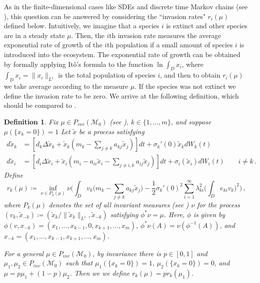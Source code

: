 \documentclass[final]{amsart}
\newtheorem{deff}[thm]{Definition}
\numberwithin{thm}{section}
\numberwithin{equation}{section}
\newcommand{\mcM}{\mathcal{M}}
\begin{document}
As in the finite-dimensional cases like SDEs and discrete time Markov chains (see \cite{ecologicalContinuous, ecologicalDiscrete, ecologicalGeneral}), this question can be answered by considering the ``invasion rates" $r_i(\mu)$ defined below. Intuitively, we imagine that a species $i$ is extinct and other species are in a steady state $\mu$. Then, 
the $i$th invasion rate measures the average exponential rate of growth of the $i$th population if a small amount of species $i$ is introduced into the ecosystem.
The exponential rate of growth can be obtained by formally applying It\^{o}'s formula to the function $\ln{\int_D x_i}$, where $\int_D x_i = \|x_i\|_{L^1}$ is the total population of species $i$, and then to obtain $r_i(\mu)$ we take average according to the measure $\mu$. If the species was not extinct we define the invasion rate to be zero. We arrive at the following definition, which should be compared to \cite[(2.3) and Proposition 3.1]{ecologicalGeneral}.

\begin{deff}\label{def:invasion-rates}
    Fix $\mu \in P_{inv}(\mcM_0)$ (see ), $k \in \{1,\dots,m\}$, and suppose $\mu(\{x_k = 0\}) = 1$ 
    Let $\tilde{x}$ be a process satisfying
    \begin{align*}
        d\tilde x_k &= [d_k\Delta \tilde x_k + \tilde x_k(m_k -\sum_{j\neq k}a_{kj}\tilde x_j)]dt + \sigma_k'(0)\tilde x_kdW_k(t) \\
        d\tilde x_i &= [d_i\Delta \tilde x_i + \tilde x_i(m_i - a_{ii}\tilde x_i -\sum_{j \neq i,k}a_{ij} \tilde x_j)]dt + \sigma_i(\tilde x_i)dW_i(t) \qquad i \neq k \,. 
    \end{align*}
    Define 
    \begin{equation}\label{eq:lotka-vol-invasion-rate}
        r_k(\mu) \coloneqq \inf_{\nu \in P_k(\mu)} \nu\Big(\int_D v_k\Big(m_k - \sum_{j\neq k} a_{kj}\tilde x_j\Big) - \frac{1}{2} \sigma_k'(0)^2\sum_{i=1}^\infty \lambda_{ki}^2\Big(\int_D e_{ki} v_k\Big)^2\Big) \,,
    \end{equation}
    where $P_k(\mu)$ denotes the set of all invariant measures (see  ) $\nu$ for the process $(v_k,\tilde x_{-k}) \coloneqq (\tilde x_k/\|\tilde x_k\|_{L^1}, \tilde x_{-k})$ satisfying $\phi^*\nu = \mu$. Here, $\phi$ is given by $\phi(v,x_{-k}) = (x_1,\dots,x_{k-1},0,x_{k+1},\dots,x_m)$, $\phi^*\nu(A) = \nu(\phi^{-1}(A))$, and  $x_{-k} = ( x_1,\dots, x_{k-1}, x_{k+1},\dots, x_m)$.

    For a general $\mu \in P_{inv}(\mcM_0)$, by invariance there is $p \in [0,1]$ and $\mu_1, \mu_2 \in P_{inv}(\mcM_0)$ such that $\mu_1(\{x_k = 0\}) = 1$, $\mu_2(\{x_k = 0\}) = 0$, and $\mu = p\mu_1 + (1-p)\mu_2$. Then we 
    we define $r_k(\mu) = pr_k(\mu_1)$. 
\end{deff}
\end{document}
